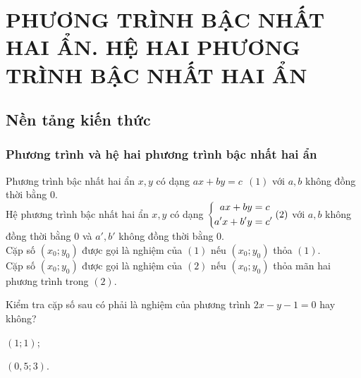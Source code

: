 \section{PHƯƠNG TRÌNH BẬC NHẤT HAI ẨN. HỆ HAI 	PHƯƠNG TRÌNH BẬC NHẤT HAI ẨN}
\subsection{Nền tảng kiến thức}
\subsubsection{Phương trình và hệ hai phương trình bậc nhất hai ẩn}
Phương trình bậc nhất hai ẩn $x,y$ có dạng $ax+by=c \ \ (1)$ với $a,b$ không đồng thời bằng $0$.\\
Hệ phương trình bậc nhất hai ẩn $x,y$ có dạng $\left\{\begin{aligned}ax+by&=c\\a'x+b'y&=c'\end{aligned}\right.(2)$ với $a,b$ không đồng thời bằng $0$ và $a',b'$ không đồng thời bằng $0$.\\
Cặp số $(x_0;y_0)$ được gọi là nghiệm của $(1)$ nếu $(x_0;y_0)$ thỏa $(1)$.\\
Cặp số $(x_0;y_0)$ được gọi là nghiệm của $(2)$ nếu $(x_0;y_0)$ thỏa mãn hai phương trình trong $(2)$.
\begin{vd}
	Kiểm tra cặp số sau có phải là nghiệm của phương trình $2x-y-1=0$ hay không?
	\begin{enumEX}{2}
		\item $(1;1)$;
		\item $(0{,}5;3)$.
	\end{enumEX}
\end{vd}
